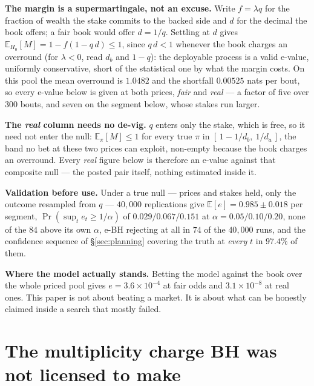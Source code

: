 \documentclass{article}
\begin{document}
\textbf{The margin is a supermartingale, not an excuse.} Write $f=\lambda q$ for the fraction of wealth the stake commits to the backed side and $d$ for the decimal the book offers; a fair book would offer $d=1/q$. Settling at $d$ gives $\mathbb{E}_{H_0}[M] = 1 - f(1-q\,d) \le 1$, since $q\,d<1$ whenever the book charges an overround (for $\lambda<0$, read $d_b$ and $1-q$): the deployable process is a valid e-value, uniformly conservative, short of the statistical one by what the margin costs. On this pool the mean overround is $1.0482$ and the shortfall $0.00525$ nats per bout, so every e-value below is given at both prices, \emph{fair} and \emph{real} --- a factor of five over $300$ bouts, and seven on the segment below, whose stakes run larger.

\textbf{The \emph{real} column needs no de-vig.} $q$ enters only the stake, which is free, so it need not enter the null: $\mathbb{E}_{\pi}[M]\le1$ for every true $\pi$ in $[\,1-1/d_b,\ 1/d_a\,]$, the band no bet at these two prices can exploit, non-empty because the book charges an overround. Every \emph{real} figure below is therefore an e-value against that composite null --- the posted pair itself, nothing estimated inside it.

\textbf{Validation before use.} Under a true null --- prices and stakes held, only the outcome resampled from $q$ --- $40{,}000$ replications give $\mathbb{E}[e]=0.985\pm0.018$ per segment, $\Pr(\sup_t e_t \ge 1/\alpha)$ of $0.029/0.067/0.151$ at $\alpha=0.05/0.10/0.20$, none of the $84$ above its own $\alpha$, e-BH rejecting at all in $74$ of the $40{,}000$ runs, and the confidence sequence of \S\ref{sec:planning} covering the truth at \emph{every} $t$ in $97.4\%$ of them.

\textbf{Where the model actually stands.} Betting the model against the book over the whole priced pool gives $e = 3.6\times 10^{-4}$ at fair odds and $3.1\times10^{-8}$ at real ones. This paper is not about beating a market. It is about what can be honestly claimed inside a search that mostly failed.

\section{The multiplicity charge BH was not licensed to make}
\end{document}
